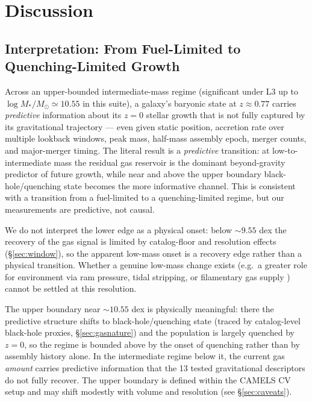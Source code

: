 \documentclass[twocolumn,linenumbers]{aastex701}
\newcommand{\logM}{\log M_*}
\begin{document}
\section{\textbf{Discussion}}
\label{sec:discussion}

\subsection{Interpretation: From Fuel-Limited to Quenching-Limited Growth}

Across an upper-bounded intermediate-mass regime (significant under L3 up to
$\logM/M_\odot \simeq 10.55$ in this suite), a galaxy's baryonic state at
$z \approx 0.77$ carries \textit{predictive} information about its $z = 0$
stellar growth that is not fully captured by its gravitational trajectory ---
even given static position, accretion rate over multiple lookback windows,
peak mass, half-mass assembly epoch, merger counts, and major-merger timing.
The literal result is a \textit{predictive} transition: at low-to-intermediate
mass the residual gas reservoir is the dominant beyond-gravity predictor of future
growth, while near and above the upper boundary black-hole/quenching state becomes
the more informative channel. This is consistent with a transition from a
fuel-limited to a quenching-limited regime, but our measurements are predictive,
not causal.

We do not interpret the lower edge as a physical onset: below $\sim 9.55$ dex
the recovery of the gas signal is limited by catalog-floor and resolution
effects (\S\ref{sec:window}), so the apparent low-mass onset is a recovery edge
rather than a physical transition. Whether a genuine low-mass change exists
(e.g.\ a greater role for environment via ram pressure, tidal stripping, or
filamentary gas supply \citep{dekel2009}) cannot be settled at this resolution.

The upper boundary near $\sim 10.55$ dex is physically meaningful: there the
predictive structure shifts to black-hole/quenching state (traced by
catalog-level black-hole proxies, \S\ref{sec:gasnature}) and the population is
largely quenched by $z = 0$, so the regime is bounded above by the onset of
quenching rather than by assembly history alone.
In the intermediate regime below it, the current gas \emph{amount} carries
predictive information that the 13 tested gravitational descriptors do not
fully recover.
The upper boundary is defined within the CAMELS CV setup and may shift modestly
with volume and resolution (see \S\ref{sec:caveats}).
\end{document}
